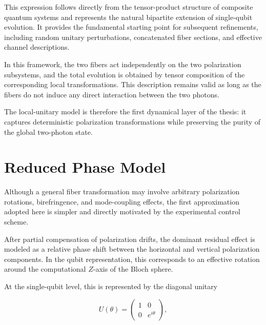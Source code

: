\medskip

This expression follows directly from the tensor-product structure of composite quantum systems and represents the natural bipartite extension of single-qubit evolution. It provides the fundamental starting point for subsequent refinements, including random unitary perturbations, concatenated fiber sections, and effective channel descriptions.

\medskip

In this framework, the two fibers act independently on the two polarization subsystems, and the total evolution is obtained by tensor composition of the corresponding local transformations. This description remains valid as long as the fibers do not induce any direct interaction between the two photons.

\medskip

The local-unitary model is therefore the first dynamical layer of the thesis: it captures deterministic polarization transformations while preserving the purity of the global two-photon state.


\section{Reduced Phase Model}

Although a general fiber transformation may involve arbitrary polarization rotations, birefringence, and mode-coupling effects, the first approximation adopted here is simpler and directly motivated by the experimental control scheme.

After partial compensation of polarization drifts, the dominant residual effect is modeled as a relative phase shift between the horizontal and vertical polarization components. In the qubit representation, this corresponds to an effective rotation around the computational \( Z \)-axis of the Bloch sphere.

\medskip

At the single-qubit level, this is represented by the diagonal unitary

\begin{equation}
U(\theta)
=
\begin{pmatrix}
1 & 0\\
0 & e^{i\theta}
\end{pmatrix},
\label{eq:single_qubit_phase_unitary}
\end{equation}

